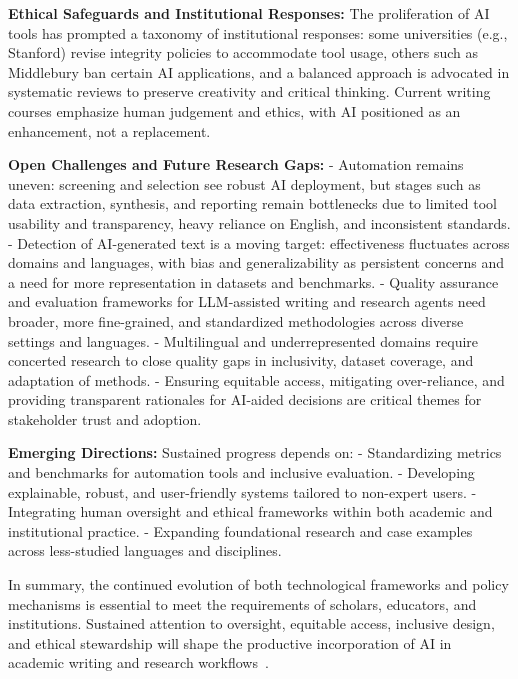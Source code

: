 \documentclass[sigconf]{acmart}
\begin{document}
\textbf{Ethical Safeguards and Institutional Responses:}
The proliferation of AI tools has prompted a taxonomy of institutional responses: some universities (e.g., Stanford) revise integrity policies to accommodate tool usage, others such as Middlebury ban certain AI applications, and a balanced approach is advocated in systematic reviews to preserve creativity and critical thinking\cite{ref96,ref109}. Current writing courses emphasize human judgement and ethics, with AI positioned as an enhancement, not a replacement.

\textbf{Open Challenges and Future Research Gaps:}
- Automation remains uneven: screening and selection see robust AI deployment, but stages such as data extraction, synthesis, and reporting remain bottlenecks due to limited tool usability and transparency, heavy reliance on English, and inconsistent standards\cite{ref28,ref31,ref37,ref80}.
- Detection of AI-generated text is a moving target: effectiveness fluctuates across domains and languages, with bias and generalizability as persistent concerns and a need for more representation in datasets and benchmarks\cite{ref39,ref100}.
- Quality assurance and evaluation frameworks for LLM-assisted writing and research agents need broader, more fine-grained, and standardized methodologies across diverse settings and languages\cite{ref49,ref51,ref62}.
- Multilingual and underrepresented domains require concerted research to close quality gaps in inclusivity, dataset coverage, and adaptation of methods\cite{ref93,ref105}.
- Ensuring equitable access, mitigating over-reliance, and providing transparent rationales for AI-aided decisions are critical themes for stakeholder trust and adoption\cite{ref46,ref47,ref97,ref98}.

\textbf{Emerging Directions:}
Sustained progress depends on:
- Standardizing metrics and benchmarks for automation tools and inclusive evaluation.
- Developing explainable, robust, and user-friendly systems tailored to non-expert users.
- Integrating human oversight and ethical frameworks within both academic and institutional practice.
- Expanding foundational research and case examples across less-studied languages and disciplines.

In summary, the continued evolution of both technological frameworks and policy mechanisms is essential to meet the requirements of scholars, educators, and institutions. Sustained attention to oversight, equitable access, inclusive design, and ethical stewardship will shape the productive incorporation of AI in academic writing and research workflows~\cite{ref10,ref11,ref12,ref28,ref29,ref30,ref31,ref35,ref36,ref37,ref38,ref39,ref46,ref47,ref49,ref51,ref62,ref76,ref80,ref86,ref88,ref89,ref90,ref91,ref92,ref93,ref94,ref96,ref97,ref98,ref100,ref102,ref104,ref105,ref107,ref108,ref109,ref110}.
\end{document}
